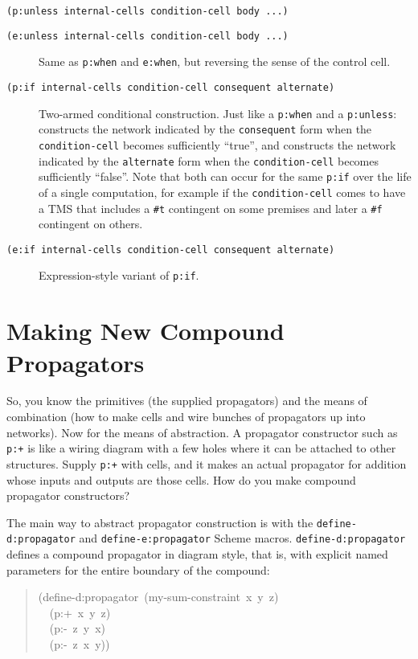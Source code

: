 \documentclass[12pt,letterpaper,english]{article}
\begin{document}
\texttt{(p:unless internal-cells condition-cell body ...)}
\begin{description}
\item[{\texttt{(e:unless internal-cells condition-cell body ...)}}] \leavevmode 
Same as \texttt{p:when} and \texttt{e:when}, but reversing the sense of the
control cell.

\item[{\texttt{(p:if internal-cells condition-cell consequent alternate)}}] \leavevmode 
Two-armed conditional construction.  Just like a \texttt{p:when} and a
\texttt{p:unless}: constructs the network indicated by the \texttt{consequent}
form when the \texttt{condition-cell} becomes sufficiently ``true'', and
constructs the network indicated by the \texttt{alternate} form when the
\texttt{condition-cell} becomes sufficiently ``false''.  Note that both can
occur for the same \texttt{p:if} over the life of a single computation,
for example if the \texttt{condition-cell} comes to have a TMS that includes
a \texttt{{\#}t} contingent on some premises and later a \texttt{{\#}f} contingent
on others.

\item[{\texttt{(e:if internal-cells condition-cell consequent alternate)}}] \leavevmode 
Expression-style variant of \texttt{p:if}.

\end{description}



\section{Making New Compound Propagators}
\label{making-new-compound-propagators}

So, you know the primitives (the supplied propagators) and the means
of combination (how to make cells and wire bunches of propagators up
into networks).  Now for the means of abstraction.  A propagator
constructor such as \texttt{p:+} is like a wiring diagram with a few holes
where it can be attached to other structures.  Supply \texttt{p:+} with
cells, and it makes an actual propagator for addition whose inputs and
outputs are those cells.  How do you make compound propagator
constructors?

The main way to abstract propagator construction is with the
\texttt{define-d:propagator} and \texttt{define-e:propagator} Scheme macros.
\texttt{define-d:propagator} defines a compound propagator in diagram style,
that is, with explicit named parameters for the entire boundary of the
compound:
\begin{quote}{\ttfamily \raggedright \noindent
(define-d:propagator~(my-sum-constraint~x~y~z)~\\
~~(p:+~x~y~z)~\\
~~(p:-~z~y~x)~\\
~~(p:-~z~x~y))
}\end{quote}
\end{document}
